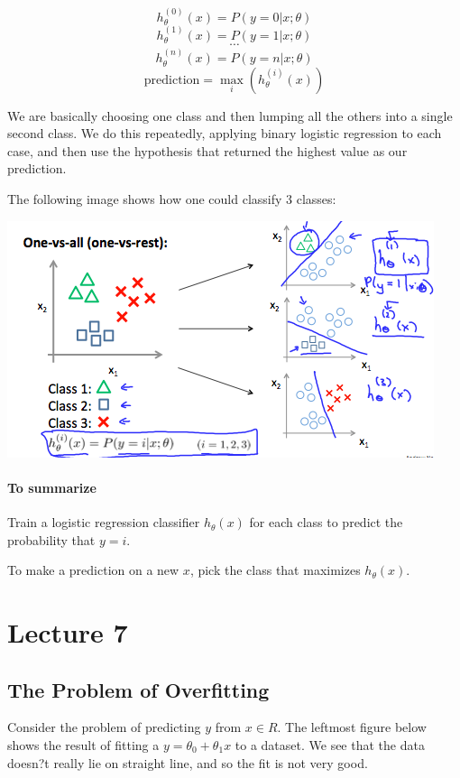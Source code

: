 \documentclass[UTF8]{article}
\begin{document}
\[ h_\theta^{(0)}(x) = P(y = 0 | x ; \theta) \]
\[ h_\theta^{(1)}(x) = P(y = 1 | x ; \theta) \]
\[ \cdots \]
\[ h_\theta^{(n)}(x) = P(y = n | x ; \theta) \]
\[ \mathrm{prediction} = \max_i( h_\theta ^{(i)}(x) )\]

We are basically choosing one class and then lumping all the others into a single second class. We do this repeatedly, applying binary logistic regression to each case, and then use the hypothesis that returned the highest value as our prediction.

The following image shows how one could classify 3 classes:

\includegraphics[width = \textwidth]{NotePics/6_7_1.png}

\paragraph{To summarize}

Train a logistic regression classifier $h_\theta(x)$ for each class to predict the probability that $y=i$.

To make a prediction on a new $x$, pick the class that maximizes $h_\theta (x)$.

\newpage

\section{Lecture 7}

\subsection{The Problem of Overfitting}

Consider the problem of predicting $y$ from $x \in R$. The leftmost figure below shows the result of fitting a $y = \theta_0+\theta_1x$ to a dataset. We see that the data doesn?t really lie on straight line, and so the fit is not very good.
\end{document}
